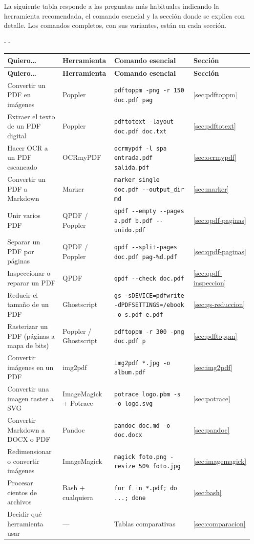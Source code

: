 \documentclass[11pt,a4paper]{article}
\makeatletter
\newcommand{\necesitaespacio}[1]{\par\penalty-100\begingroup
	\setlength{\dimen@}{#1}\dimen@ii\pagegoal\advance\dimen@ii-\pagetotal
	\ifdim\dimen@>\dimen@ii\ifdim\dimen@ii>\z@\vfil\fi\penalty-\@M\fi\endgroup}
\newcommand{\cmd}[1]{\texttt{\textcolor{colcmd}{#1}}}      %
\newcommand{\cab}[1]{\textbf{#1}}
\makeatother
\begin{document}
	La siguiente tabla responde a las preguntas más habituales indicando la herramienta recomendada, el comando esencial y la sección donde se explica con detalle. Los comandos completos, con sus variantes, están en cada sección.
	
	\begingroup\small
	\necesitaespacio{10\baselineskip}
	\begin{longtable}{L{4.1cm}L{2.6cm}L{6.26cm}C{1.6cm}}
		\toprule{}\cab{Quiero\ldots} & \cab{Herramienta} & \cab{Comando esencial} & \cab{Sección}\\\midrule
		\endfirsthead
		\toprule{}\cab{Quiero\ldots} & \cab{Herramienta} & \cab{Comando esencial} & \cab{Sección}\\\midrule
		\endhead
		\bottomrule
		\endfoot
		Convertir un PDF en imágenes & Poppler & \cmd{pdftoppm -png -r 150 doc.pdf pag} & \ref{sec:pdftoppm}\\*
		Extraer el texto de un PDF digital & Poppler & \cmd{pdftotext -layout doc.pdf doc.txt} & \ref{sec:pdftotext}\\
		Hacer OCR a un PDF escaneado & OCRmyPDF & \cmd{ocrmypdf -l spa entrada.pdf salida.pdf} & \ref{sec:ocrmypdf}\\
		Convertir un PDF a Markdown & Marker & \cmd{marker\_\allowbreak{}single doc.pdf -{}-output\_\allowbreak{}dir md} & \ref{sec:marker}\\
		Unir varios PDF & QPDF / Poppler & \cmd{qpdf -{}-empty -{}-pages a.pdf b.pdf -{}- unido.pdf} & \ref{sec:qpdf-paginas}\\
		Separar un PDF por páginas & QPDF / Poppler & \cmd{qpdf -{}-split-\allowbreak{}pages doc.pdf pag-\%d.pdf} & \ref{sec:qpdf-paginas}\\
		Inspeccionar o reparar un PDF & QPDF & \cmd{qpdf -{}-check doc.pdf} & \ref{sec:qpdf-inspeccion}\\
		Reducir el tamaño de un PDF & Ghostscript & \cmd{gs -sDEVICE=\allowbreak{}pdfwrite -dPDFSETTINGS=\allowbreak{}/\allowbreak{}ebook -o s.pdf e.pdf} & \ref{sec:gs-reduccion}\\
		Rasterizar un PDF (páginas a mapa de bits) & Poppler / Ghostscript & \cmd{pdftoppm -r 300 -png doc.pdf p} & \ref{sec:pdftoppm}\\
		Convertir imágenes en un PDF & img2pdf & \cmd{img2pdf *.jpg -o album.pdf} & \ref{sec:img2pdf}\\
		Convertir una imagen raster a SVG & ImageMagick + Potrace & \cmd{potrace logo.pbm -s -o logo.svg} & \ref{sec:potrace}\\
		Convertir Markdown a DOCX o PDF & Pandoc & \cmd{pandoc doc.md -o doc.docx} & \ref{sec:pandoc}\\
		Redimensionar o convertir imágenes & ImageMagick & \cmd{magick foto.png -resize 50\% foto.jpg} & \ref{sec:imagemagick}\\
		Procesar cientos de archivos & Bash + cualquiera & \cmd{for f in *.pdf; do ...; done} & \ref{sec:bash}\\*
		Decidir qué herramienta usar & --- & Tablas comparativas & \ref{sec:comparacion}\\
	\end{longtable}
	\endgroup
	
\end{document}
